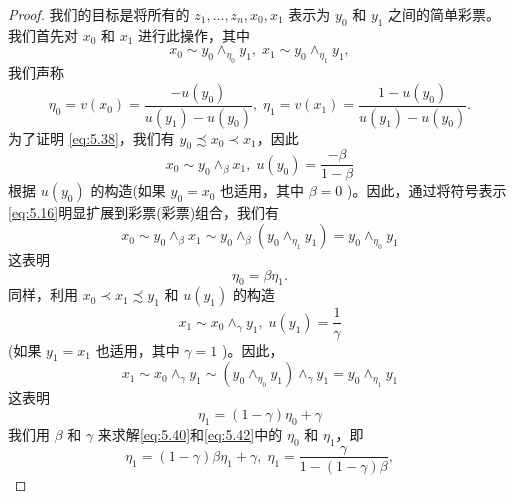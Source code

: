 \begin{proof}
我们的目标是将所有的 \({z}_{1},\ldots ,{z}_{n},{x}_{0},{x}_{1}\) 表示为 \({y}_{0}\) 和 \({y}_{1}\) 之间的简单彩票。我们首先对 \({x}_{0}\) 和 \({x}_{1}\) 进行此操作，其中
\begin{equation}
\label{eq:5.37}
{x}_{0} \sim  {y}_{0}{ \land  }_{{\eta }_{0}}{y}_{1},\;{x}_{1} \sim  {y}_{0}{ \land  }_{{\eta }_{1}}{y}_{1},
\end{equation}
我们声称
\begin{equation}
\label{eq:5.38}
{\eta }_{0} = v\left( {x}_{0}\right)  = \frac{-u\left( {y}_{0}\right) }{u\left( {y}_{1}\right)  - u\left( {y}_{0}\right) },\;{\eta }_{1} = v\left( {x}_{1}\right)  = \frac{1 - u\left( {y}_{0}\right) }{u\left( {y}_{1}\right)  - u\left( {y}_{0}\right) }.
\end{equation}
为了证明 \eqref{eq:5.38}，我们有 \({y}_{0} \precsim  {x}_{0} \prec  {x}_{1}\)，因此
\begin{equation}
\label{eq:5.39}
{x}_{0} \sim  {y}_{0}{ \land  }_{\beta }{x}_{1},\;u\left( {y}_{0}\right)  = \frac{-\beta }{1 - \beta }
\end{equation}
根据 \(u\left( {y}_{0}\right)\) 的构造(如果 \({y}_{0} = {x}_{0}\) 也适用，其中 \(\beta  = 0\) )。因此，通过将符号表示\eqref{eq:5.16}明显扩展到彩票(彩票)组合，我们有
\[
{x}_{0} \sim  {y}_{0}{ \land  }_{\beta }{x}_{1} \sim  {y}_{0}{ \land  }_{\beta }\left( {{y}_{0}{ \land  }_{{\eta }_{1}}{y}_{1}}\right)  = {y}_{0}{ \land  }_{{\eta }_{0}}{y}_{1}
\]
这表明
\begin{equation}
\label{eq:5.40}
{\eta }_{0} = \beta {\eta }_{1}.
\end{equation}
同样，利用 \({x}_{0} \prec  {x}_{1} \precsim  {y}_{1}\) 和 \(u\left( {y}_{1}\right)\) 的构造
\begin{equation}
\label{eq:5.41}
{x}_{1} \sim  {x}_{0}{ \land  }_{\gamma }{y}_{1},\;u\left( {y}_{1}\right)  = \frac{1}{\gamma }
\end{equation}
(如果 \({y}_{1} = {x}_{1}\) 也适用，其中 \(\gamma  = 1\) )。因此，
\[
{x}_{1} \sim  {x}_{0}{ \land  }_{\gamma }{y}_{1} \sim  \left( {{y}_{0}{ \land  }_{{\eta }_{0}}{y}_{1}}\right) { \land  }_{\gamma }{y}_{1} = {y}_{0}{ \land  }_{{\eta }_{1}}{y}_{1}
\]
这表明
\begin{equation}
\label{eq:5.42}
{\eta }_{1} = \left( {1 - \gamma }\right) {\eta }_{0} + \gamma
\end{equation}
我们用 \(\beta\) 和 \(\gamma\) 来求解\eqref{eq:5.40}和\eqref{eq:5.42}中的 \({\eta }_{0}\) 和 \({\eta }_{1}\)，即
\[
{\eta }_{1} = \left( {1 - \gamma }\right) \beta {\eta }_{1} + \gamma ,\;{\eta }_{1} = \frac{\gamma }{1 - \left( {1 - \gamma }\right) \beta },
\]
\end{proof}
